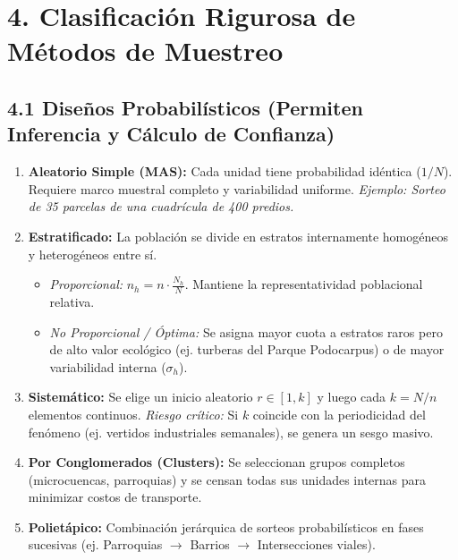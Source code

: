 \documentclass[11pt,a4paper]{article}
\begin{document}
\vspace{0.2cm}

\section*{4. Clasificación Rigurosa de Métodos de Muestreo}

\subsection*{4.1 Diseños Probabilísticos (Permiten Inferencia y Cálculo de Confianza)}
\begin{enumerate}[leftmargin=*]
  \item \textbf{Aleatorio Simple (MAS):} Cada unidad tiene probabilidad idéntica ($1/N$). Requiere marco muestral completo y variabilidad uniforme. \textit{Ejemplo: Sorteo de 35 parcelas de una cuadrícula de 400 predios.}
  \item \textbf{Estratificado:} La población se divide en estratos internamente homogéneos y heterogéneos entre sí.
  \begin{itemize}
    \item \textit{Proporcional:} $n_h = n \cdot \frac{N_h}{N}$. Mantiene la representatividad poblacional relativa.
    \item \textit{No Proporcional / Óptima:} Se asigna mayor cuota a estratos raros pero de alto valor ecológico (ej. turberas del Parque Podocarpus) o de mayor variabilidad interna ($\sigma_h$).
  \end{itemize}
  \item \textbf{Sistemático:} Se elige un inicio aleatorio $r \in [1, k]$ y luego cada $k = N/n$ elementos continuos.
  \textit{Riesgo crítico:} Si $k$ coincide con la periodicidad del fenómeno (ej. vertidos industriales semanales), se genera un sesgo masivo.
  \item \textbf{Por Conglomerados (Clusters):} Se seleccionan grupos completos (microcuencas, parroquias) y se censan todas sus unidades internas para minimizar costos de transporte.
  \item \textbf{Polietápico:} Combinación jerárquica de sorteos probabilísticos en fases sucesivas (ej. Parroquias $\to$ Barrios $\to$ Intersecciones viales).
\end{enumerate}
\end{document}
